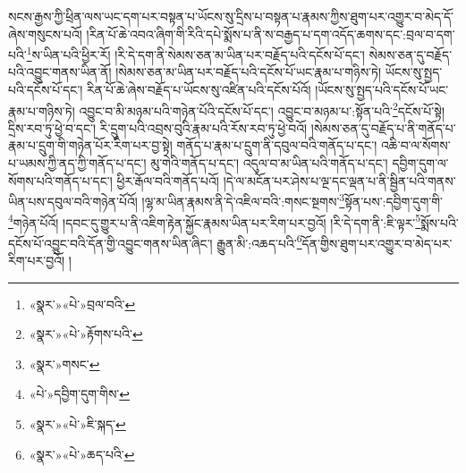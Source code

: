 སངས་རྒྱས་ཀྱི་ཕྲིན་ལས་ཡང་དག་པར་བསྟན་པ་ཡོངས་སུ་དྲིས་པ་བསྟན་པ་རྣམས་ཀྱིས་ཐུག་པར་འགྱུར་བ་མེད་དོ་ཞེས་གསུངས་པའོ། །རིན་པོ་ཆེ་འབའ་ཞིག་གི་རིའི་དཔེ་སྨོས་པ་ནི་ས་བརྒྱད་པ་དག་འདོད་ཆགས་དང་:བྲལ་བ་དག་པའི་\footnote{«སྣར་»«པེ་»བྲལ་བའི་}ས་ཡིན་པའི་ཕྱིར་རོ། །རི་དེ་དག་ནི་སེམས་ཅན་མ་ཡིན་པར་བརྗོད་པའི་དངོས་པོ་དང་། སེམས་ཅན་དུ་བརྗོད་པའི་འབྱུང་གནས་ཡིན་ནོ། །སེམས་ཅན་མ་ཡིན་པར་བརྗོད་པའི་དངོས་པོ་ཡང་རྣམ་པ་གཉིས་ཏེ། ཡོངས་སུ་སྤྱད་པའི་དངོས་པོ་དང་། རིན་པོ་ཆེ་ཞེས་བརྗོད་པ་ཡོངས་སུ་འཛིན་པའི་དངོས་པོའོ། །ཡོངས་སུ་སྤྱད་པའི་དངོས་པོ་ཡང་རྣམ་པ་གཉིས་ཏེ། འབྱུང་བ་མི་མཉམ་པའི་གཉེན་པོའི་དངོས་པོ་དང་། འབྱུང་བ་མཉམ་པ་:སྟོན་པའི་\footnote{«སྣར་»«པེ་»རྟོགས་པའི་}དངོས་པོ་སྟེ། དྲིས་རབ་ཏུ་ཕྱེ་བ་དང་། རི་དྲུག་པའི་འབྲས་བུའི་རྣམ་པའི་རོས་རབ་ཏུ་ཕྱེ་བའོ། །སེམས་ཅན་དུ་བརྗོད་པ་ནི་གནོད་པ་རྣམ་པ་དྲུག་གི་གཉེན་པོར་རིག་པར་བྱ་སྟེ། གནོད་པ་རྣམ་པ་དྲུག་ནི་དབུལ་བའི་གནོད་པ་དང་། འཆི་བ་ལ་སོགས་པ་ཡམས་ཀྱི་ནད་ཀྱི་གནོད་པ་དང་། མུ་གེའི་གནོད་པ་དང་། འདུལ་བ་མ་ཡིན་པའི་གནོད་པ་དང་། དབྱིག་དུག་ལ་སོགས་པའི་གནོད་པ་དང་། ཕྱིར་རྒོལ་བའི་གནོད་པའོ། །དེ་ལ་མངོན་པར་ཤེས་པ་ལྔ་དང་ལྡན་པ་ནི་སྦྱིན་པའི་གནས་ཡིན་པས་དབུལ་བའི་གཉེན་པོའོ། །ལྷ་མ་ཡིན་རྣམས་ནི་དེ་འཇིལ་བའི་:གསང་སྔགས་\footnote{«སྣར་»གསང་}སྟོན་པས་:དབྱིག་དུག་གི་\footnote{«པེ་»དབྱིག་དུག་གིས་}གཉེན་པོའོ། །དབང་དུ་གྱུར་པ་ནི་འཇིག་རྟེན་སྐྱོང་རྣམས་ཡིན་པར་རིག་པར་བྱའོ། །རི་དེ་དག་ནི་:ཇི་ལྟར་\footnote{«སྣར་»«པེ་»ཇི་སྐད་}སྨོས་པའི་དངོས་པོ་འབྱུང་བའི་དོན་གྱི་འབྱུང་གནས་ཡིན་ཞིང་། རྒྱུན་མི་:འཆད་པའི་\footnote{«སྣར་»«པེ་»ཆད་པའི་}དོན་གྱིས་ཐུག་པར་འགྱུར་བ་མེད་པར་རིག་པར་བྱའོ། །
